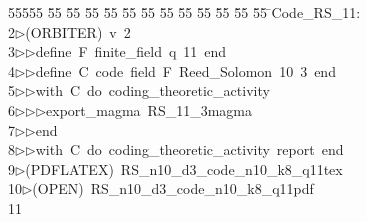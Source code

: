 %
%
\begin{tabbing}
55555 \= 55 \= 55 \= 55 \= 55 \= 55 \= 55 \= 55 \= 55 \= 55 \= 55 \= 55 \= 55 \= \>Code\_RS\_11:\\[0pt]
2\>$\triangleright$\>(ORBITER)\ v\ 2\ \\[0pt]
3\>$\triangleright$\>$\triangleright$\>define\ F\ finite\_field\ q\ 11\ end\ \\[0pt]
4\>$\triangleright$\>$\triangleright$\>define\ C\ code\ field\ F\ Reed\_Solomon\ 10\ 3\ end\ \\[0pt]
5\>$\triangleright$\>$\triangleright$\>with\ C\ do\ coding\_theoretic\_activity\ \\[0pt]
6\>$\triangleright$\>$\triangleright$\>$\triangleright$\>export\_magma\ RS\_11\_3magma\ \\[0pt]
7\>$\triangleright$\>$\triangleright$\>end\ \\[0pt]
8\>$\triangleright$\>$\triangleright$\>with\ C\ do\ coding\_theoretic\_activity\ report\ end\\[0pt]
9\>$\triangleright$\>(PDFLATEX)\ RS\_n10\_d3\_code\_n10\_k8\_q11tex\\[0pt]
10\>$\triangleright$\>(OPEN)\ RS\_n10\_d3\_code\_n10\_k8\_q11pdf\\[0pt]
11\>\end{tabbing}
